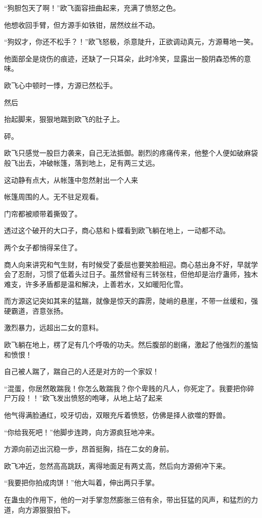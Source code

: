\begin{this_body}
“狗胆包天了啊！”欧飞面容扭曲起来，充满了愤怒之色。

他想收回手臂，但方源手如铁钳，居然纹丝不动。

“狗奴才，你还不松手？！”欧飞怒极，杀意陡升，正欲调动真元，方源蓦地一笑。

他面部全是烧伤的痕迹，还缺了一只耳朵，此时冷笑，显露出一股阴森恐怖的意味。

欧飞心中顿时一悸，方源已然松手。

然后

抬起脚来，狠狠地踹到欧飞的肚子上。

砰。

欧飞只感觉一股巨力袭来，自己无法抵御。剧烈的疼痛传来，他整个人便如破麻袋般飞出去，冲破帐篷，落到地上，足有两三丈远。

这动静有点大，从帐篷中忽然射出一个人来

帐篷周围的人。无不驻足观看。

门帘都被顺带着撕毁了。

透过这个破开的大口子，商心慈和卜蝶看到欧飞躺在地上，一动都不动。

两个女子都悄得呆住了。

商人向来讲究和气生财，有时候受了委屈也要笑脸相迎。商心慈出身不好，早就学会了忍耐，习惯了低着头过日子。虽然曾经有三转张柱，但他却是治疗蛊师，独木难支，许多矛盾都是温和解决，上善若水，又如暖阳化雪。

而方源这记突如其来的猛踹，就像是惊天的霹雳，陡峭的悬崖，不带一丝缓和，强硬霸道，咨意张扬。

激烈暴力，远超出二女的意料。

欧飞躺在地上，楞了足有几个呼吸的功夫。然后腹部的剧痛，激起了他强烈的羞恼和愤恨！

自己被人踹了，踹自己的人还是对方的一个家奴！

“混蛋，你居然敢踹我！你怎么敢踹我？你个卑贱的凡人，你死定了。我要把你碎尸万段！！”欧飞发出愤怒的咆哮，从地上站了起来

他气得满脸通红，咬牙切齿，双眼充斥着愤怒，仿佛是择人欲噬的野兽。

“你给我死吧！”他脚步连跨，向方源疯狂地冲来。

方源向前迈出沉稳一步，昂首挺胸，挡在二女的身前。

欧飞冲近，忽然高高跳跃，离得地面足有两丈高，然后向方源俯冲下来。

“我要把你拍成肉饼！”他大叫着，伸出两只手掌。

在蛊虫的作用下，他的一对手掌忽然膨胀三倍有余，带出狂猛的风声，和猛烈的力道，向方源狠狠拍下。


\end{this_body}
